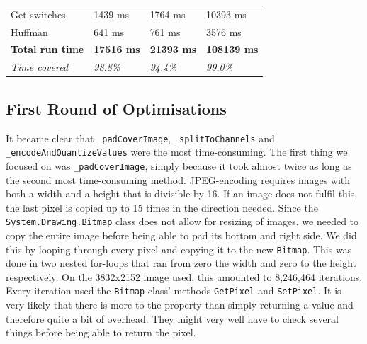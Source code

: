 \begin{table}[H]
\begin{tabular}{@{}llll@{}}
        Get switches            & 1439 ms                                                                                   & 1764 ms                                                                                    & 10393 ms                                                                                \\
        Huffman                 & 641 ms                                                                                    & 761 ms                                                                                     & 3576 ms                                                                                 \\ \midrule
        \textbf{Total run time} & \textbf{17516 ms}                                                                         & \textbf{21393 ms}                                                                          & \textbf{108139 ms}                                                                      \\
        \textit{Time covered}   & \textit{98.8\%}                                                                           & \textit{94.4\%}                                                                            & \textit{99.0\%}                                                                         \\ \bottomrule
    \end{tabular}
\end{table}

\subsection{First Round of Optimisations}
It became clear that \lstinline|_padCoverImage|, \lstinline|_splitToChannels| and \lstinline|_encodeAndQuantizeValues| were the most time-consuming.
The first thing we focused on was \lstinline|_padCoverImage|, simply because it took almost twice as long as the second most time-consuming method.
JPEG-encoding requires images with both a width and a height that is divisible by 16.
If an image does not fulfil this, the last pixel is copied up to 15 times in the direction needed.
Since the \lstinline|System.Drawing.Bitmap| class does not allow for resizing of images, we needed to copy the entire image before being able to pad its bottom and right side.
We did this by looping through every pixel and copying it to the new \lstinline|Bitmap|.
This was done in two nested for-loops that ran from zero the width and zero to the height respectively.
On the 3832x2152 image used, this amounted to 8,246,464 iterations.
Every iteration used the \lstinline|Bitmap| class' methods \lstinline|GetPixel| and \lstinline|SetPixel|.
It is very likely that there is more to the property than simply returning a value and therefore quite a bit of overhead. They might very well have to check several things before being able to return the pixel.

